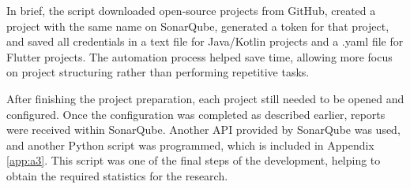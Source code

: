 \par
In brief, the script downloaded open-source projects from GitHub, created a project with the same name on SonarQube, generated a token for that project, and saved all credentials in a text file for Java/Kotlin projects and a .yaml file for Flutter projects. The automation process helped save time, allowing more focus on project structuring rather than performing repetitive tasks.
\par
After finishing the project preparation, each project still needed to be opened and configured. Once the configuration was completed as described earlier, reports were received within SonarQube. Another API provided by SonarQube was used, and another Python script was programmed, which is included in Appendix \ref{app:a3}. This script was one of the final steps of the development, helping to obtain the required statistics for the research.
